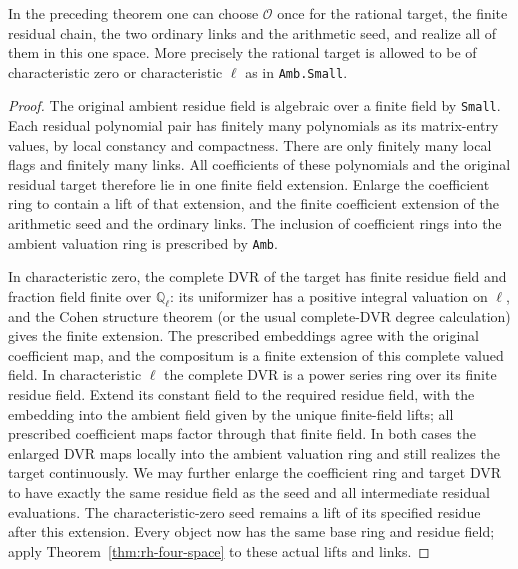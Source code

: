\begin{corollary}
\label{cor:rh-four-common-coefficients}
In the preceding theorem one can choose $\mathcal O$ once
for the rational target, the finite residual chain, the
two ordinary links and the arithmetic seed, and realize
all of them in this one space. More precisely the rational
target is allowed to be of characteristic zero or
characteristic $\ell$ as in \texttt{Amb.Small}.
\end{corollary}
\begin{proof}
The original ambient residue field is algebraic over a
finite field by \texttt{Small}. Each residual polynomial
pair has finitely many polynomials as its matrix-entry
values, by local constancy and compactness. There are
only finitely many local flags and finitely many links.
All coefficients of these polynomials and the original
residual target therefore lie in one finite field
extension. Enlarge the coefficient ring to contain a
lift of that extension, and the finite coefficient
extension of the arithmetic seed and the ordinary links.
The inclusion of coefficient rings into the ambient
valuation ring is prescribed by \texttt{Amb}.

In characteristic zero, the complete DVR of the target
has finite residue field and fraction field finite over
$\mathbb Q_\ell$: its uniformizer has a positive integral
valuation on $\ell$, and the Cohen structure theorem
(or the usual complete-DVR degree calculation) gives
the finite extension. The prescribed embeddings agree
with the original coefficient map, and the compositum
is a finite extension of this complete valued field.
In characteristic $\ell$ the complete DVR is a power
series ring over its finite residue field. Extend its
constant field to the required residue field, with the
embedding into the ambient field given by the unique
finite-field lifts; all prescribed coefficient maps
factor through that finite field. In both cases the
enlarged DVR maps locally into the ambient valuation
ring and still realizes the target continuously.
We may further enlarge the coefficient ring and target
DVR to have exactly the same residue field as the
seed and all intermediate residual evaluations.
The characteristic-zero seed remains a lift of its
specified residue after this extension. Every object
now has the same base ring and residue field; apply
Theorem~\ref{thm:rh-four-space} to these actual lifts
and links.
\end{proof}
